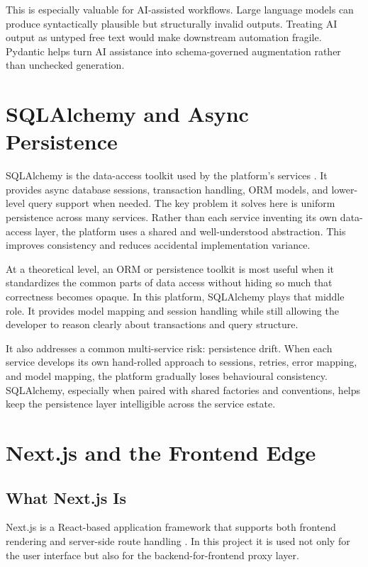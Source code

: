 This is especially valuable for AI-assisted workflows. Large language models can produce syntactically plausible but structurally invalid outputs. Treating AI output as untyped free text would make downstream automation fragile. Pydantic helps turn AI assistance into schema-governed augmentation rather than unchecked generation.

\section{SQLAlchemy and Async Persistence}
SQLAlchemy is the data-access toolkit used by the platform's services \cite{sqlalchemy_docs}. It provides async database sessions, transaction handling, ORM models, and lower-level query support when needed. The key problem it solves here is uniform persistence across many services. Rather than each service inventing its own data-access layer, the platform uses a shared and well-understood abstraction. This improves consistency and reduces accidental implementation variance.

At a theoretical level, an ORM or persistence toolkit is most useful when it standardizes the common parts of data access without hiding so much that correctness becomes opaque. In this platform, SQLAlchemy plays that middle role. It provides model mapping and session handling while still allowing the developer to reason clearly about transactions and query structure.

It also addresses a common multi-service risk: persistence drift. When each service develops its own hand-rolled approach to sessions, retries, error mapping, and model mapping, the platform gradually loses behavioural consistency. SQLAlchemy, especially when paired with shared factories and conventions, helps keep the persistence layer intelligible across the service estate.

\section{Next.js and the Frontend Edge}
\subsection{What Next.js Is}
Next.js is a React-based application framework that supports both frontend rendering and server-side route handling \cite{nextjs_docs}. In this project it is used not only for the user interface but also for the backend-for-frontend proxy layer.

